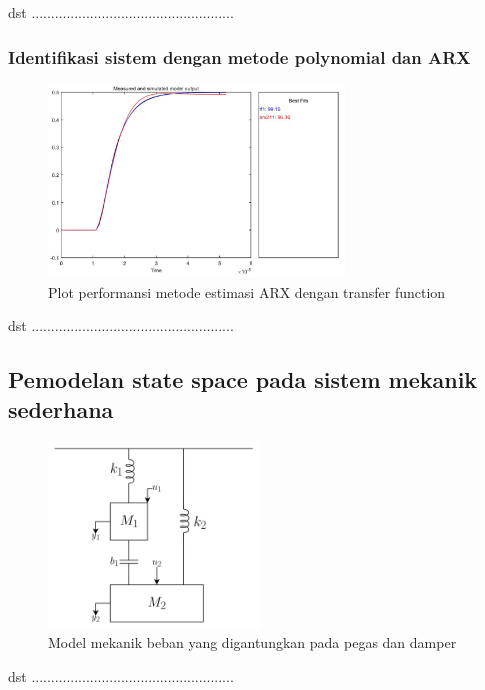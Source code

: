 \documentclass[../main.tex]{subfiles}
\begin{document}
                dst ....................................................
                
            \subsubsection{Identifikasi sistem dengan metode            polynomial dan ARX}
                
                \begin{figure}[H]
                    \centering
                    \includegraphics[width = 0.7\textwidth]{assets/image/ESTIMATION MODEL.pdf}
                    \caption{Plot performansi metode estimasi ARX dengan transfer function}
                    \label{fig:my_label}
            \end{figure}
            
            dst ....................................................
            
        \subsection{Pemodelan state space pada sistem mekanik sederhana}
            \begin{figure}[H]
                \centering
                \includegraphics[width = 0.5\textwidth]{assets/image/soal_pemodelan_pegas_damper.png}
                \caption{Model mekanik beban yang digantungkan pada pegas dan damper}
                \label{gambar_4}
            \end{figure}
            dst ....................................................
            
\end{document}
